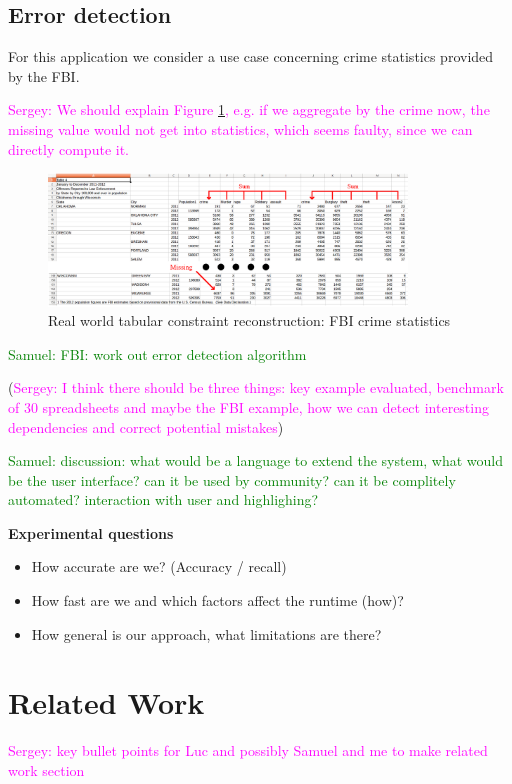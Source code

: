 \documentclass{sig-alternate-05-2015}
\newcommand{\sergey}[1]{\textcolor{magenta}{{\sc Sergey:} #1}\xspace}
\newcommand{\samuel}[1]{\textcolor{green}{{\sc Samuel:} #1}\xspace}
\begin{document}
\subsection{Error detection}
For this application we consider a use case concerning crime statistics provided by the FBI.


\sergey{We should explain Figure \ref{fig:fbi}, e.g. if we aggregate by the crime now, the missing value would not get into statistics, which seems faulty, since we can directly compute it.}

\begin{figure}[thb]
  \begin{center}
    \includegraphics[width=0.85\textwidth]{figures/fbi_figure_highlighted.png}
  \end{center}
  \caption{Real world tabular constraint reconstruction: FBI crime statistics}
  \label{fig:fbi}
\end{figure}

\samuel{FBI: work out error detection algorithm}

(\sergey{I think there should be three things: key example evaluated, benchmark of 30 spreadsheets and maybe the FBI example, how we can detect interesting dependencies and correct potential mistakes})

\samuel{discussion: what would be a language to extend the system, what would be the user interface? can it be used by community?  can it be complitely automated? interaction with user and highlighing?
}

{\bfseries
  Experimental questions
}

\begin{itemize}
  \item  How accurate are we? (Accuracy / recall)
  \item  How fast are we and which factors affect the runtime (how)?
  \item  How general is our approach, what limitations are there?
\end{itemize}


\section{Related Work}
\sergey{key bullet points for Luc and possibly Samuel and me to make related work section}
\end{document}
